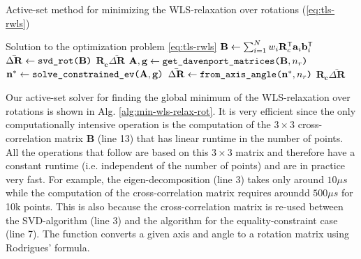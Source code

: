 \begin{algorithm}[!ht]
	\caption{Active-set method for minimizing the WLS-relaxation over rotations (\ref{eq:tls-rwls})}
	\label{alg:min-wls-relax-rot}
	\begin{algorithmic}[1]
		\Ensure Solution to the optimization problem \ref{eq:tls-rwls}
		\hypertarget{ref:min-wls-relax-rot2}{
			}
		\State $\mathbf{B} \leftarrow \sum_{i=1}^N w_i \mathbf{R}_c^{\mathsf{T}} \mathbf{a}_i\mathbf{b}_i^{\mathsf{T}} $ 
		\State $\bar{\Delta \mathbf{R}} \leftarrow \texttt{svd\_rot(} \mathbf{B} \texttt{)}$  
		 
		\State \Return $\mathbf{R_c} \bar{\Delta \mathbf{R}}$
		\EndIf
		\State $\mathbf{A}, \mathbf{g} \leftarrow \texttt{get\_davenport\_matrices(} \mathbf{B}, n_r \texttt{)}$ 
		\State $\mathbf{n}^* \leftarrow \texttt{solve\_constrained\_ev(} \mathbf{A}, \mathbf{g} \texttt{)}$ 
		\State $\bar{\Delta \mathbf{R}} \leftarrow \texttt{from\_axis\_angle(}\mathbf{n}^*, n_r \texttt{)}$ 
		\State \Return $\mathbf{R_c} \bar{\Delta \mathbf{R}}$
		\EndFunction
	\end{algorithmic}
\end{algorithm}


Our active-set solver for finding the global minimum of the WLS-relaxation over rotations is shown in Alg. \ref{alg:min-wls-relax-rot}. It is very efficient since the only computationally intensive operation is the computation of the $3 \times 3$ cross-correlation matrix $\mathbf{B}$ (line 13) that has linear runtime in the number of points. All the operations that follow are based on this $3 \times 3$ matrix and therefore have a constant runtime (i.e. independent of the number of points) and are in practice very fast. For example, the eigen-decomposition (line 3) takes only around $10 \mu s$ while the computation of the cross-correlation matrix requires aroundd $500 \mu s$ for 10k points. This is also because the cross-correlation matrix is re-used between the SVD-algorithm (line 3) and the algorithm for the equality-constraint case (line 7). The function  converts a given axis and angle to a rotation matrix using Rodrigues' formula.

